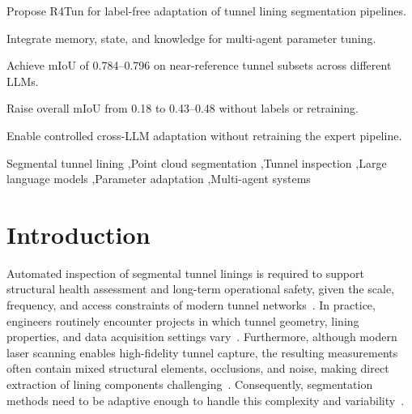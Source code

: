\documentclass[a4paper,fleqn]{cas-dc}
\begin{document}
{%

\begin{highlights}
\item Propose R4Tun for label-free adaptation of tunnel lining segmentation pipelines.
\item Integrate memory, state, and knowledge for multi-agent parameter tuning.
\item Achieve mIoU of 0.784--0.796 on near-reference tunnel subsets across different LLMs.
\item Raise overall mIoU from 0.18 to 0.43--0.48 without labels or retraining.
\item Enable controlled cross-LLM adaptation without retraining the expert pipeline.
\end{highlights}


\begin{keywords}
Segmental tunnel lining \sep Point cloud segmentation \sep Tunnel inspection \sep Large language models \sep Parameter adaptation \sep Multi-agent systems
\end{keywords}
\date{\today}

\maketitle

\smallskip

\section{Introduction}\label{sec:intro}

Automated inspection of segmental tunnel linings is required to support structural health assessment and long-term operational safety, given the scale, frequency, and access constraints of modern tunnel networks~\cite{attard2018}. In practice, engineers routinely encounter projects in which tunnel geometry, lining properties, and data acquisition settings vary~\cite{weidner2024generalized,yue2024damage}. Furthermore, although modern laser scanning enables high-fidelity tunnel capture, the resulting measurements often contain mixed structural elements, occlusions, and noise, making direct extraction of lining components challenging~\cite{huang2021bim,sjolander2023towards}. Consequently, segmentation methods need to be adaptive enough to handle this complexity and variability~\cite{montero2015, strauss2020sensing}.

}
\end{document}
